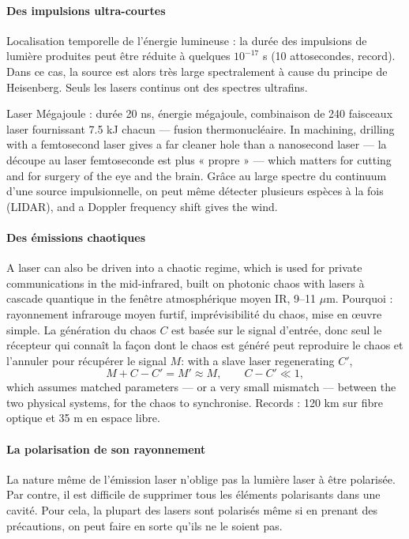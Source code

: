 \paragraph{Des impulsions ultra-courtes}
Localisation temporelle de l'énergie lumineuse : la durée des impulsions de
lumière produites peut être réduite à quelques $10^{-17}$ s (10 attosecondes,
record). Dans ce cas, la source est alors très large spectralement à cause du
principe de Heisenberg. Seuls les lasers continus ont des spectres ultrafins.

\begin{example}
  Laser Mégajoule : durée 20 ns, énergie mégajoule, combinaison de 240
  faisceaux laser fournissant 7.5 kJ chacun --- fusion thermonucléaire. In
  machining, drilling with a femtosecond laser gives a far cleaner hole than a
  nanosecond laser --- la découpe au laser femtoseconde est plus « propre » ---
  which matters for cutting and for surgery of the eye and the brain. Grâce au
  large spectre du continuum d'une source impulsionnelle, on peut même détecter
  plusieurs espèces à la fois (LIDAR), and a Doppler frequency shift gives the
  wind.
\end{example}

\paragraph{Des émissions chaotiques}
A laser can also be driven into a chaotic regime, which is used for private
communications in the mid-infrared, built on photonic chaos with lasers à
cascade quantique in the fenêtre atmosphérique moyen IR, 9--11 $\mu$m.
Pourquoi : rayonnement infrarouge moyen furtif, imprévisibilité du chaos, mise
en œuvre simple. La génération du chaos $C$ est basée sur le signal d'entrée,
donc seul le récepteur qui connaît la façon dont le chaos est généré peut
reproduire le chaos et l'annuler pour récupérer le signal $M$: with a slave
laser regenerating $C'$,
\[M+C-C'=M'\approx M,\qquad C-C'\ll 1,\]
which assumes matched parameters --- or a very small mismatch --- between the two
physical systems, for the chaos to synchronise. Records : 120 km sur fibre
optique et 35 m en espace libre.

\paragraph{La polarisation de son rayonnement}
La nature même de l'émission laser n'oblige pas la lumière laser à être
polarisée. Par contre, il est difficile de supprimer tous les éléments
polarisants dans une cavité. Pour cela, la plupart des lasers sont polarisés
même si en prenant des précautions, on peut faire en sorte qu'ils ne le soient
pas.

